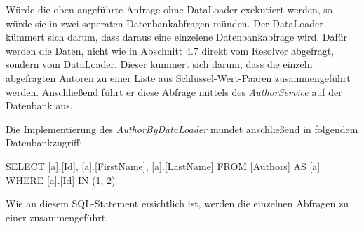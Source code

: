Würde die oben angeführte Anfrage ohne DataLoader exekutiert werden, so würde sie in zwei seperaten Datenbankabfragen münden.
Der DataLoader kümmert sich darum, dass daraus eine einzelene Datenbankabfrage wird.
Dafür werden die Daten, nicht wie in Abschnitt 4.7 direkt vom Resolver abgefragt, sondern vom DataLoader.
Dieser kümmert sich darum, dass die einzeln abgefragten Autoren zu einer Liste aus Schlüssel-Wert-Paaren zusammengeführt werden.
Anschließend führt er diese Abfrage mittels des \textit{AuthorService} auf der Datenbank aus.
\newline

Die Implementierung des \textit{AuthorByDataLoader} mündet anschließend in folgendem Datenbankzugriff:
\begin{JsCode}
SELECT [a].[Id], [a].[FirstName], [a].[LastName]
FROM [Authors] AS [a]
WHERE [a].[Id] IN (1, 2)
\end{JsCode}

Wie an diesem SQL-Statement ersichtlich ist, werden die einzelnen Abfragen zu einer zusammengeführt.